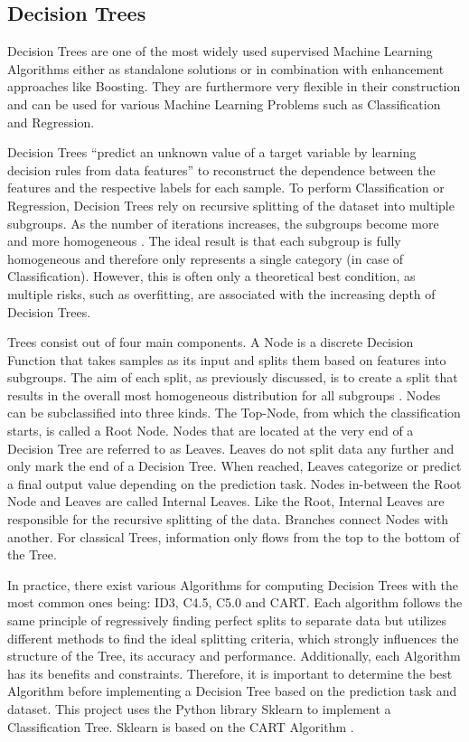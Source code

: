 \subsection{Decision Trees}

Decision Trees are one of the most widely used supervised Machine Learning Algorithms either 
as standalone solutions or in combination with enhancement approaches like Boosting. They are 
furthermore very flexible in their construction and can be used for various Machine Learning 
Problems such as Classification and Regression. 

Decision Trees “predict an unknown value of a target variable by learning decision rules from 
data features” to reconstruct the dependence between the features and the respective labels for 
each sample. To perform Classification or Regression, Decision Trees rely on recursive 
splitting of the dataset into multiple subgroups. As the number of iterations increases, the 
subgroups become more and more homogeneous \cite[p.330]{James2021}. The ideal result is that each subgroup is fully 
homogeneous and therefore only represents a single category (in case of Classification). However, 
this is often only a theoretical best condition, as multiple risks, such as overfitting, are 
associated with the increasing depth of Decision Trees.

Trees consist out of four main components. A Node is a discrete Decision Function that takes 
samples as its input and splits them based on features into subgroups. The aim of each split, 
as previously discussed, is to create a split that results in the overall most homogeneous 
distribution for all subgroups \cite[p.6]{lewis2000introduction}. Nodes can be subclassified into three kinds. The Top-Node, 
from which the classification starts, is called a Root Node. Nodes that are located at the 
very end of a Decision Tree are referred to as Leaves. Leaves do not split data any further and 
only mark the end of a Decision Tree. When reached, Leaves categorize or predict a final output 
value depending on the prediction task. Nodes in-between the Root Node and Leaves are called 
Internal Leaves. Like the Root, Internal Leaves are responsible for the recursive splitting of 
the data. Branches connect Nodes with another. For classical Trees, information only flows from 
the top to the bottom of the Tree. 

In practice, there exist various Algorithms for computing Decision Trees with the most common ones 
being: ID3, C4.5, C5.0 and CART. Each algorithm follows the same principle of regressively finding 
perfect splits to separate data but utilizes different methods to find the ideal splitting 
criteria, which strongly influences the structure of the Tree, its accuracy and performance. 
Additionally, each Algorithm has its benefits and constraints. Therefore, it is important to 
determine the best Algorithm before implementing a Decision Tree based on the prediction task 
and dataset. This project uses the Python library Sklearn to implement a Classification Tree. 
Sklearn is based on the CART Algorithm \cite[10.10.6]{sklearn Decision Trees}.

